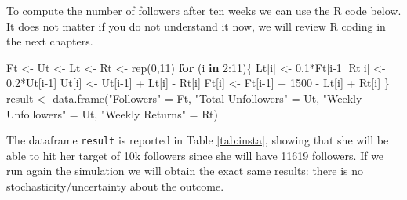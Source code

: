 \documentclass[
]{book}
\newenvironment{Shaded}{\begin{snugshade}}{\end{snugshade}}
\newcommand{\ControlFlowTok}[1]{\textcolor[rgb]{0.13,0.29,0.53}{\textbf{#1}}}
\newcommand{\DecValTok}[1]{\textcolor[rgb]{0.00,0.00,0.81}{#1}}
\newcommand{\FloatTok}[1]{\textcolor[rgb]{0.00,0.00,0.81}{#1}}
\newcommand{\FunctionTok}[1]{\textcolor[rgb]{0.00,0.00,0.00}{#1}}
\newcommand{\NormalTok}[1]{#1}
\newcommand{\OtherTok}[1]{\textcolor[rgb]{0.56,0.35,0.01}{#1}}
\newcommand{\SpecialCharTok}[1]{\textcolor[rgb]{0.00,0.00,0.00}{#1}}
\newcommand{\StringTok}[1]{\textcolor[rgb]{0.31,0.60,0.02}{#1}}
\begin{document}
To compute the number of followers after ten weeks we can use the R code below. It does not matter if you do not understand it now, we will review R coding in the next chapters.

\begin{Shaded}
\begin{Highlighting}[]
\NormalTok{Ft }\OtherTok{\textless{}{-}}\NormalTok{ Ut }\OtherTok{\textless{}{-}}\NormalTok{ Lt }\OtherTok{\textless{}{-}}\NormalTok{ Rt }\OtherTok{\textless{}{-}} \FunctionTok{rep}\NormalTok{(}\DecValTok{0}\NormalTok{,}\DecValTok{11}\NormalTok{)}
\ControlFlowTok{for}\NormalTok{ (i }\ControlFlowTok{in} \DecValTok{2}\SpecialCharTok{:}\DecValTok{11}\NormalTok{)\{}
\NormalTok{  Lt[i] }\OtherTok{\textless{}{-}} \FloatTok{0.1}\SpecialCharTok{*}\NormalTok{Ft[i}\DecValTok{{-}1}\NormalTok{]}
\NormalTok{  Rt[i] }\OtherTok{\textless{}{-}} \FloatTok{0.2}\SpecialCharTok{*}\NormalTok{Ut[i}\DecValTok{{-}1}\NormalTok{]}
\NormalTok{  Ut[i] }\OtherTok{\textless{}{-}}\NormalTok{ Ut[i}\DecValTok{{-}1}\NormalTok{] }\SpecialCharTok{+}\NormalTok{ Lt[i] }\SpecialCharTok{{-}}\NormalTok{ Rt[i]}
\NormalTok{  Ft[i] }\OtherTok{\textless{}{-}}\NormalTok{ Ft[i}\DecValTok{{-}1}\NormalTok{] }\SpecialCharTok{+} \DecValTok{1500} \SpecialCharTok{{-}}\NormalTok{ Lt[i] }\SpecialCharTok{+}\NormalTok{ Rt[i]}
\NormalTok{\}}
\NormalTok{result }\OtherTok{\textless{}{-}} \FunctionTok{data.frame}\NormalTok{(}\StringTok{"Followers"} \OtherTok{=}\NormalTok{ Ft, }\StringTok{"Total Unfollowers"} \OtherTok{=}\NormalTok{ Ut,}
           \StringTok{"Weekly Unfollowers"} \OtherTok{=}\NormalTok{ Ut, }\StringTok{"Weekly Returns"} \OtherTok{=}\NormalTok{ Rt)}
\end{Highlighting}
\end{Shaded}

The dataframe \texttt{result} is reported in Table \ref{tab:insta}, showing that she will be able to hit her target of 10k followers since she will have 11619 followers. If we run again the simulation we will obtain the exact same results: there is no stochasticity/uncertainty about the outcome.
\end{document}
